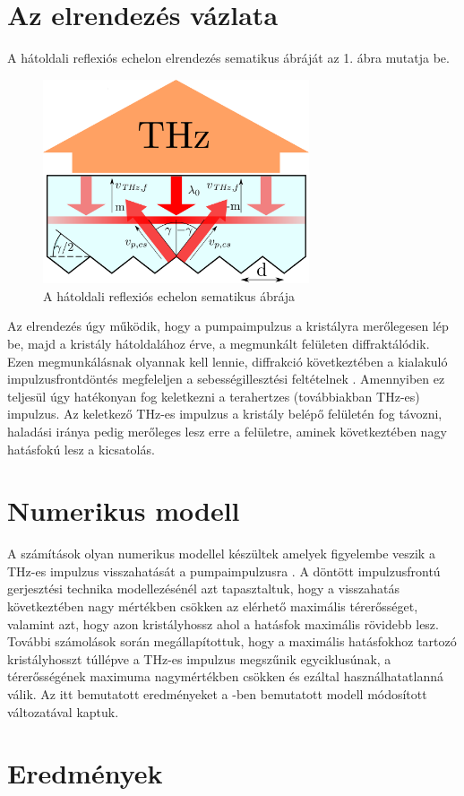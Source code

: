 \documentclass[12pt, a4paper]{article}
\begin{document}
\section{Az elrendezés vázlata}
A hátoldali reflexiós echelon elrendezés sematikus ábráját az 1. ábra mutatja be.
\begin{figure}[H]
\centering
\includegraphics[width=0.7\textwidth]{rajz-1.pdf}
\caption{A hátoldali reflexiós echelon sematikus ábrája \cite{toth2019single}}
\end{figure}
Az elrendezés úgy működik, hogy a pumpaimpulzus a kristályra merőlegesen lép be, majd a kristály hátoldalához érve, a megmunkált felületen diffraktálódik. Ezen megmunkálásnak olyannak kell lennie, diffrakció következtében a kialakuló impulzusfrontdöntés megfeleljen a sebességillesztési feltételnek \cite{hebling2002velocity}. Amennyiben ez teljesül úgy hatékonyan fog keletkezni a terahertzes (továbbiakban THz-es) impulzus. Az keletkező THz-es impulzus a kristály belépő felületén fog távozni, haladási iránya pedig merőleges lesz erre a felületre, aminek következtében nagy hatásfokú lesz a kicsatolás. 
\section{Numerikus modell}
A számítások olyan numerikus modellel készültek amelyek figyelembe veszik a THz-es impulzus visszahatását a pumpaimpulzusra \cite{ravi2014limitations}. A döntött impulzusfrontú gerjesztési technika modellezésénél azt tapasztaltuk, hogy a visszahatás következtében nagy mértékben csökken az elérhető maximális térerősséget, valamint azt, hogy azon kristályhossz ahol a hatásfok maximális rövidebb lesz. További számolások során megállapítottuk, hogy a maximális hatásfokhoz tartozó kristályhosszt túllépve a THz-es impulzus megszűnik egyciklusúnak, a térerősségének maximuma nagymértékben csökken és ezáltal használhatatlanná válik. Az itt bemutatott eredményeket a \cite{ravi2014limitations}-ben bemutatott modell módosított változatával kaptuk.
\section{Eredmények}
\singlespace
\printbibliography[title = Irodalomjegszék]
\end{document}
